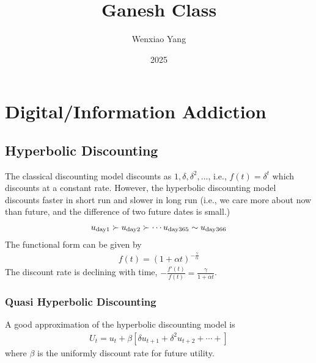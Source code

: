 \documentclass[11pt]{elegantbook}
\title{Ganesh Class}
\author{Wenxiao Yang}
\institute{Haas School of Business, University of California Berkeley}
\date{2025}
\begin{document}
\maketitle

\frontmatter
\tableofcontents

\mainmatter



\chapter{Digital/Information Addiction}
\section{Hyperbolic Discounting}
The classical discounting model discounts as $1,\delta,\delta^2,...$, i.e., $f(t)=\delta^t$ which discounts at a constant rate. However, the hyperbolic discounting model discounts faster in short run and slower in long run (i.e., we care more about now than future, and the difference of two future dates is small.)
\begin{equation}
    \begin{aligned}
        u_\textnormal{day1}\succ u_\textnormal{day2}\succ \cdots u_\textnormal{day365}\sim u_\textnormal{day366}
    \end{aligned}
    \nonumber
\end{equation}
The functional form can be given by
\begin{equation}
    \begin{aligned}
        f(t)=\left(1+\alpha t\right)^{-\frac{\gamma}{\alpha}}
    \end{aligned}
    \nonumber
\end{equation}
The discount rate is declining with time, $-\frac{f'(t)}{f(t)}=\frac{\gamma}{1+\alpha t}$.

\subsection{Quasi Hyperbolic Discounting}
A good approximation of the hyperbolic discounting model is
\begin{equation}
    \begin{aligned}
        U_t=u_t+\beta\left[\delta u_{t+1}+\delta^2 u_{t+2}+\cdots+\right]
    \end{aligned}
    \nonumber
\end{equation}
where $\beta$ is the uniformly discount rate for future utility.







\end{document}
